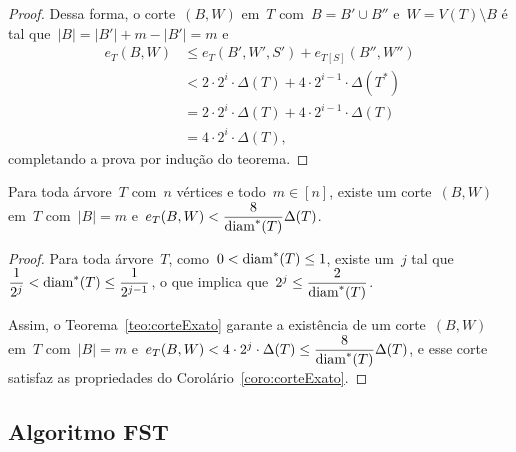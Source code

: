 \begin{proof}
			Dessa forma, o corte~$(B,W)$ em~$T$
			com~${B=B'\cup B''}$ e~${W=V(T)\setminus B}$ é tal
			que~${|B|=|B'| + m-|B'| = m}$ e
			\begin{align}
				e_T(B,W)&\le e_T(B',W',S') + e_{T[S]}(B'',W'') 
				\nonumber\\
				&< 2\cdot2^i\cdot\Delta(T) + 4\cdot 2^{i-1}\cdot
				\Delta(T^*)\nonumber\\
				&= 2\cdot2^i\cdot\Delta(T) + 4\cdot 2^{i-1}\cdot
				\Delta(T)\nonumber\\
				&= 4\cdot 2^{i}\cdot\Delta(T), \nonumber
			\end{align}
			completando a prova por indução do teorema.
	\end{proof}

	\bigskip
	\bigskip

	\begin{coro}
	\label{coro:corteExato}
		Para toda árvore~$T$ com~$n$ vértices e todo~${m\in[n]}$, existe
		um corte~$(B,W)$ em~$T$ com~${|B|=m}$ 
		e~${e_T(B,W)< \dfrac{8}{\mathrm{diam}^*(T)}\Delta(T)}$.
	\end{coro}

	\begin{proof}
		Para toda árvore~$T$,
		como~$0<\mathrm{diam}^*(T)\le 1$,
		existe um~$j$ tal
		que~${\dfrac{1}{2^j}}<\mathrm{diam}^*(T)\le \dfrac{1}{2^{j-1}}$,
		o que implica que~${2^j\le\dfrac{2}{\mathrm{diam}^*(T)}}$.

		Assim, o Teorema~\ref{teo:corteExato} garante a existência de um 
		corte~$(B,W)$ em~$T$ com~${|B|=m}$ 
		e~$e_T(B,W)< 4\cdot 2^j\cdot\Delta(T)\le \dfrac{8}{\mathrm{diam}^*(T)} \Delta(T)$,
		e esse corte satisfaz as propriedades do 
		Corolário~\ref{coro:corteExato}. 
	\end{proof}

	\bigskip
	\bigskip
	\bigskip
	\bigskip
	\bigskip

	\subsection{Algoritmo FST}

